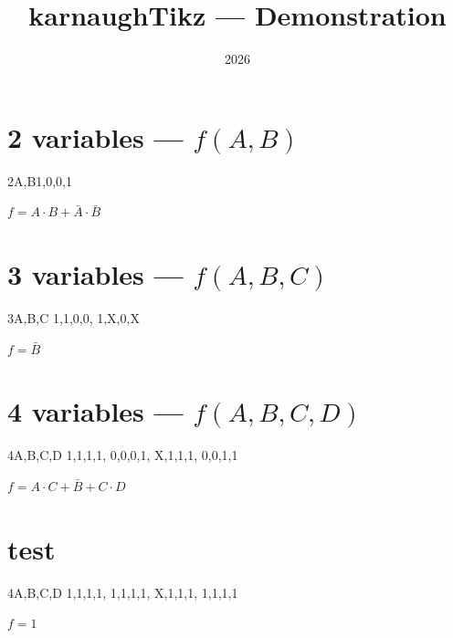 \documentclass[a4paper,11pt]{article}
\title{\textbf{karnaughTikz} --- Demonstration}
\date{2026}
\begin{document}
\maketitle

\section{2 variables --- $f(A,B)$}

\begin{center}
\begin{karnaugh}{2}{A,B}{1,0,0,1} %
  \kvautogroup
\end{karnaugh}
\end{center}

$f = A \cdot B + \bar{A} \cdot \bar{B}$

\section{3 variables --- $f(A,B,C)$}

\begin{center}
\begin{karnaugh}{3}{A,B,C}%
  {1,1,0,0, 1,X,0,X} %
  \kvautogroup
\end{karnaugh}
\end{center}

$f = \bar{B}$

\section{4 variables --- $f(A,B,C,D)$}

\begin{center}
\begin{karnaugh}[cell=1.1cm]{4}{A,B,C,D}%
  {1,1,1,1, 0,0,0,1, X,1,1,1, 0,0,1,1}
  \kvautogroup
\end{karnaugh}
\end{center}

$f = A \cdot C + \bar{B} + C \cdot D$

\section{test}
\begin{center}
\begin{karnaugh}[cell=1.1cm]{4}{A,B,C,D}%
  {1,1,1,1, 1,1,1,1, X,1,1,1, 1,1,1,1}
  \kvautogroup
\end{karnaugh}
\end{center}

$f = 1$
\end{document}

